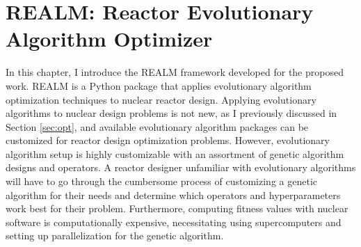 \chapter{REALM: Reactor Evolutionary Algorithm Optimizer}
\label{chap:realm}
In this chapter, I introduce the \gls{REALM} framework developed for the
proposed work.
\gls{REALM} is a Python package that applies evolutionary algorithm 
optimization techniques to nuclear reactor design. 
Applying evolutionary algorithms to nuclear design problems is not new, as I
previously discussed in Section \ref{sec:opt}, and available evolutionary algorithm 
packages can be customized for reactor design optimization problems. 
However, evolutionary algorithm setup is highly customizable with
an assortment of genetic algorithm designs and operators.
A reactor designer unfamiliar with evolutionary algorithms will have
to go through the cumbersome process of customizing a genetic algorithm 
for their needs and determine which operators and hyperparameters work best for 
their problem. 
Furthermore, computing fitness values with nuclear software is computationally 
expensive, necessitating using supercomputers and setting up parallelization 
for the genetic algorithm.

